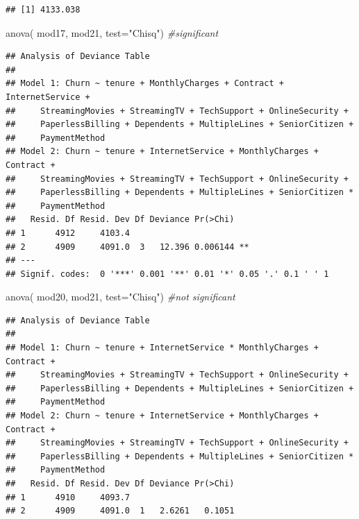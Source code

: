 \documentclass[
  twoside]{article}
\newenvironment{Shaded}{\begin{snugshade}}{\end{snugshade}}
\newcommand{\AttributeTok}[1]{\textcolor[rgb]{0.77,0.63,0.00}{#1}}
\newcommand{\CommentTok}[1]{\textcolor[rgb]{0.56,0.35,0.01}{\textit{#1}}}
\newcommand{\FunctionTok}[1]{\textcolor[rgb]{0.00,0.00,0.00}{#1}}
\newcommand{\NormalTok}[1]{#1}
\newcommand{\StringTok}[1]{\textcolor[rgb]{0.31,0.60,0.02}{#1}}
\begin{document}
\begin{verbatim}
## [1] 4133.038
\end{verbatim}

\begin{Shaded}
\begin{Highlighting}[]
\FunctionTok{anova}\NormalTok{( mod17, mod21,  }\AttributeTok{test=}\StringTok{"Chisq"}\NormalTok{) }\CommentTok{\#significant}
\end{Highlighting}
\end{Shaded}

\begin{verbatim}
## Analysis of Deviance Table
## 
## Model 1: Churn ~ tenure + MonthlyCharges + Contract + InternetService + 
##     StreamingMovies + StreamingTV + TechSupport + OnlineSecurity + 
##     PaperlessBilling + Dependents + MultipleLines + SeniorCitizen + 
##     PaymentMethod
## Model 2: Churn ~ tenure + InternetService + MonthlyCharges + Contract + 
##     StreamingMovies + StreamingTV + TechSupport + OnlineSecurity + 
##     PaperlessBilling + Dependents + MultipleLines + SeniorCitizen * 
##     PaymentMethod
##   Resid. Df Resid. Dev Df Deviance Pr(>Chi)   
## 1      4912     4103.4                        
## 2      4909     4091.0  3   12.396 0.006144 **
## ---
## Signif. codes:  0 '***' 0.001 '**' 0.01 '*' 0.05 '.' 0.1 ' ' 1
\end{verbatim}

\begin{Shaded}
\begin{Highlighting}[]
\FunctionTok{anova}\NormalTok{( mod20, mod21,  }\AttributeTok{test=}\StringTok{"Chisq"}\NormalTok{) }\CommentTok{\#not significant}
\end{Highlighting}
\end{Shaded}

\begin{verbatim}
## Analysis of Deviance Table
## 
## Model 1: Churn ~ tenure + InternetService * MonthlyCharges + Contract + 
##     StreamingMovies + StreamingTV + TechSupport + OnlineSecurity + 
##     PaperlessBilling + Dependents + MultipleLines + SeniorCitizen + 
##     PaymentMethod
## Model 2: Churn ~ tenure + InternetService + MonthlyCharges + Contract + 
##     StreamingMovies + StreamingTV + TechSupport + OnlineSecurity + 
##     PaperlessBilling + Dependents + MultipleLines + SeniorCitizen * 
##     PaymentMethod
##   Resid. Df Resid. Dev Df Deviance Pr(>Chi)
## 1      4910     4093.7                     
## 2      4909     4091.0  1   2.6261   0.1051
\end{verbatim}
\end{document}
